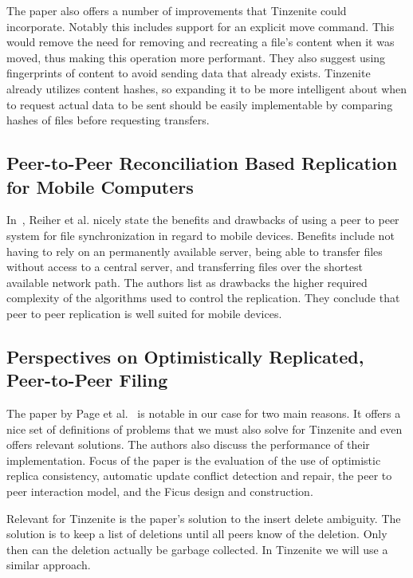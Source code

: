 The paper also offers a number of improvements that Tinzenite could incorporate.
Notably this includes support for an explicit move command.
This would remove the need for removing and recreating a file's content when it was moved, thus making this operation more performant.%
They also suggest using fingerprints of content to avoid sending data that already exists.
Tinzenite already utilizes content hashes, so expanding it to be more intelligent about when to request actual data to be sent should be easily implementable by comparing hashes of files before requesting transfers.

\subsection{Peer-to-Peer Reconciliation Based Replication for Mobile Computers}
\label{sub:Peer-to-Peer Reconciliation Based Replication for Mobile Computers}

In~\cite{reiher1996peer}, Reiher et al. nicely state the benefits and drawbacks of using a peer to peer system for file synchronization in regard to mobile devices.
Benefits include not having to rely on an permanently available server, being able to transfer files without access to a central server, and transferring files over the shortest available network path.
The authors list as drawbacks the higher required complexity of the algorithms used to control the replication.
They conclude that peer to peer replication is well suited for mobile devices.

\subsection{Perspectives on Optimistically Replicated, Peer-to-Peer Filing}
\label{sub:Perspectives on Optimistically Replicated, Peer-to-Peer Filing}

The paper by Page et al.~\cite{page1998perspectives} is notable in our case for two main reasons.
It offers a nice set of definitions of problems that we must also solve for Tinzenite and even offers relevant solutions.
The authors also discuss the performance of their implementation.
Focus of the paper is the evaluation of the use of optimistic replica consistency, automatic update conflict detection and repair, the peer to peer interaction model, and the Ficus design and construction.

Relevant for Tinzenite is the paper's solution to the insert delete ambiguity.
The solution is to keep a list of deletions until all peers know of the deletion.
Only then can the deletion actually be garbage collected.
In Tinzenite we will use a similar approach.

